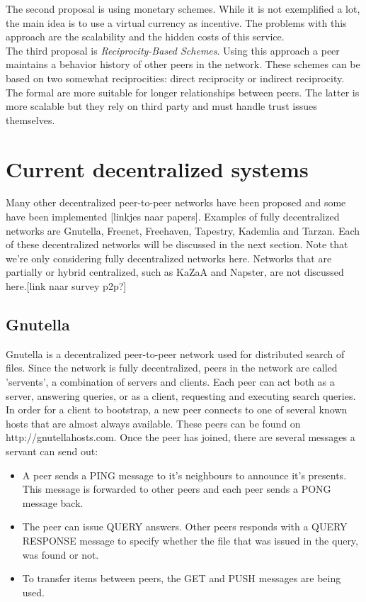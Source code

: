 \documentclass[journal]{IEEEtran}
\begin{document}
		The second proposal is using monetary schemes. While it is not exemplified a lot, the main idea is to use a virtual currency as incentive. The problems with this approach are the scalability and the hidden costs of this service.\\
		
		The third proposal is \emph{Reciprocity-Based Schemes}. Using this approach a peer maintains a behavior history of other peers in the network. These schemes can be based on two somewhat reciprocities: direct reciprocity or indirect reciprocity. The formal are more suitable for longer relationships between peers. The latter is more scalable but they rely on third party and must handle trust issues themselves.
		
	
	\section{Current decentralized systems}
		Many other decentralized peer-to-peer networks have been proposed and some have been implemented [linkjes naar papers]. Examples of fully decentralized networks are Gnutella, Freenet, Freehaven, Tapestry, Kademlia and Tarzan. Each of these decentralized networks will be discussed in the next section. Note that we're only considering fully decentralized networks here. Networks that are partially or hybrid centralized, such as KaZaA and Napster, are not discussed here.[link naar survey p2p?]
	
		\subsection{Gnutella}
			Gnutella is a decentralized peer-to-peer network used for distributed search of files. Since the network is fully decentralized, peers in the network are called 'servents', a combination of servers and clients. Each peer can act both as a server, answering queries, or as a client, requesting and executing search queries. In order for a client to bootstrap, a new peer connects to one of several known hosts that are almost always available. These peers can be found on http://gnutellahosts.com. Once the peer has joined, there are several messages a servant can send out:
		
			\begin{itemize}
				\item A peer sends a PING message to it's neighbours to announce it's presents. This message is forwarded to other peers and each peer sends a PONG message back.
				\item The peer can issue QUERY answers. Other peers responds with a QUERY RESPONSE message to specify whether the file that was issued in the query, was found or not.
				\item To transfer items between peers, the GET and PUSH messages are being used.
			\end{itemize}
			
\end{document}
